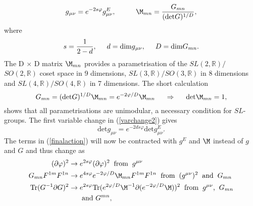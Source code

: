 \begin{equation}
g{_{\mu \nu}} = e^{-2s\varphi}g_{\mu \nu}^E, \hspace{1cm} \M_{mn} = {G_{mn} \over (\mbox{det}G)^{1/D}},
\label{varchange2}
\end{equation}
where
\begin{equation}
s={1 \over 2-d}, \hspace{0.5cm} d=\mbox{dim}g{_{\mu \nu}}, \hspace{0.5cm} D=\mbox{dim}G{_{mn}}.
\end{equation}
The D $\times$ D matrix $\M_{mn}$ provides a parametrisation of the $SL(2,{\mathbb R})/$ \newline $SO(2,{\mathbb R})$
coset space in 9 dimensions, $SL(3,{\mathbb R})/SO(3,{\mathbb R})$ in 8 dimensions and $SL(4,{\mathbb R})/SO(4,{\mathbb R})$ in 7 dimensions. 
The short calculation
\begin{equation}
G_{mn}=(\mbox{det}G)^{1/D}\M_{mn}=e^{-2\varphi /D}\M_{mn} \hspace{0.5cm} \Rightarrow \hspace{0.5cm} \mbox{det}\M_{mn}=1,
\end{equation}
shows that all parametrisations are unimodular, a necessary condition for $SL$-groups. 
The first variable change in (\ref{varchange2}) gives
\begin{equation}
\mbox{det}g_{\mu \nu} = e^{-2ds\varphi}\mbox{det}g_{\mu \nu}^E.
\end{equation}
The terms in (\ref{finalaction}) will now be contracted with $g^E$ and $\M$ instead of $g$ and $G$ and thus change as
\begin{align}
(\partial \varphi)^2 &\rightarrow e^{2s\varphi}(\partial \varphi)^2 \hspace{0.2cm} \mbox{from}\hspace{0.2cm} g^{\mu \nu} \nonumber \\
G_{mn}F^{1m}F^{1n} &\rightarrow  e^{4s\varphi} e^{-2\varphi/D} \M_{mn}F^{1m}F^{1n} \hspace{0.2cm} \mbox{from}\hspace{0.2cm} (g^{\mu \nu})^2 \hspace{0.2cm}\mbox{and}\hspace{0.2cm} G_{mn} \nonumber \\
\mbox{Tr}(G^{-1} \partial G)^2 &\rightarrow e^{2s\varphi} \mbox{Tr}(e^{2\varphi/D}\M^{-1} \partial (e^{-2\varphi/D}\M))^2\hspace{0.2cm} \mbox{from}\hspace{0.2cm} g^{\mu \nu}\mbox{,}\hspace{0.2cm}G_{mn} \nonumber \\
& \hspace{0.65cm} \mbox{and }G^{mn}\nonumber,
\end{align}
